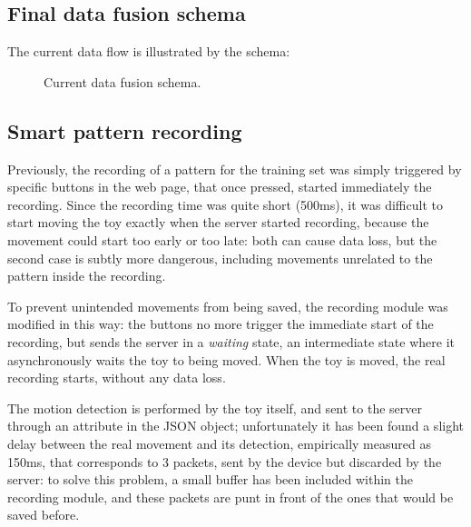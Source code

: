 \subsection{Final data fusion schema}
The current data flow is illustrated by the schema:

\begin{center}
	\begin{figure}[ht]
		\caption{Current data fusion schema.}
	\end{figure}
\end{center}

\subsection{Smart pattern recording}
Previously, the recording of a pattern for the training set was simply triggered by specific buttons in the web page, that once pressed, started immediately the recording. Since the recording time was quite short (500ms), it was difficult to start moving the toy exactly when the server started recording, because the movement could start too early or too late: both can cause data loss, but the second case is subtly more dangerous, including movements unrelated to the pattern inside the recording.

To prevent unintended movements from being saved, the recording module was modified in this way: the buttons no more trigger the immediate start of the recording, but sends the server in a \textit{waiting} state, an intermediate state where it asynchronously waits the toy to being moved. When the toy is moved, the real recording starts, without any data loss.

The motion detection is performed by the toy itself, and sent to the server through an attribute in the JSON object; unfortunately it has been found a slight delay between the real movement and its detection, empirically measured as 150ms, that corresponds to 3 packets, sent by the device but discarded by the server: to solve this problem, a small buffer has been included within the recording module, and these packets are punt in front of the ones that would be saved before.

